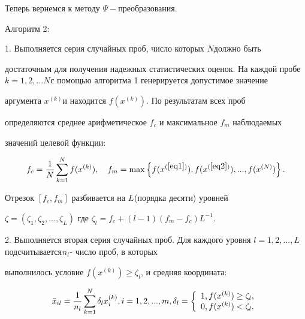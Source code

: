\documentclass [12pt]{article}
\begin{document}
Теперь вернемся к методу $\Psi - $преобразования. 



Алгоритм 2:



1. Выполняется серия случайных проб, число которых $N$должно быть 

достаточным для получения надежных статистических оценок. На каждой пробе $k 

= 1,2,...N_{ }$с помощью алгоритма 1 генерируется допустимое значение 

аргумента $x^{(k)}_{ }$и находится $f(x^{(k)})$. По результатам всех проб 

определяются среднее арифметическое $f_c $ и максимальное $f_m $ наблюдаемых 

значений целевой функции: 





\[

f_c = \frac{1}{N}\sum\limits_{k = 1}^N {f(x^{(k)})} ,

\quad

f_m = \max \left\{ {f(x^{(\ref{eq1})}),f(x^{(\ref{eq2})}),...,f(x^{(N)})} \right\}.

\]







Отрезок $[f_c ,f_m ]$ разбивается на $L_{ }$(порядка десяти) уровней 

$\zeta = (\zeta _1 ,\zeta _2 ,...,\zeta _L )$ где $\zeta _l = f_c + (l - 

1)(f_m - f_c )L^{ - 1}$. 



2. Выполняется вторая серия случайных проб. Для каждого уровня $l = 

1,2,...,L_{ }$подсчитывается$_{ }n_l _{ }$- число проб, в которых 

выполнилось условие $f(x^{(k)}) \ge \zeta _l $, и средняя координата: 





\[

\bar {x}_{il} = \frac{1}{n_l }\sum\limits_{k = 1}^N {\delta _l } x_i^{(k)} 

,i = 1,2,...,m,\delta _l = \left\{ {{\begin{array}{*{20}c}

 {1,f(x^{(k)}) \ge \zeta _l ,} \hfill \\

 {0,f(x^{(k)}) < \zeta _l .} \hfill \\

\end{array} }} \right.

\]
\end{document}
